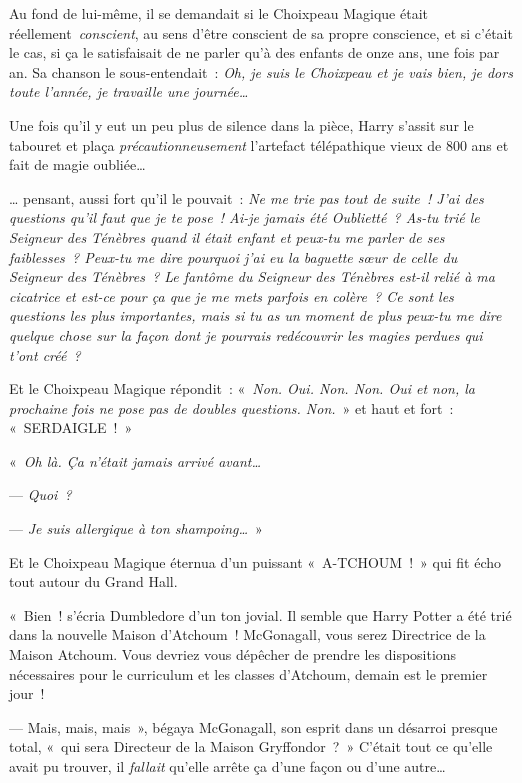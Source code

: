 \later

Au fond de lui-même, il se demandait si le Choixpeau Magique était réellement~\emph{conscient}, au sens d'être conscient de sa propre conscience, et si c'était le cas, si ça le satisfaisait de ne parler qu'à des enfants de onze ans, une fois par an. Sa chanson le sous-entendait~: \emph{Oh, je suis le Choixpeau et je vais bien, je dors toute l'année, je travaille une journée…}

Une fois qu'il y eut un peu plus de silence dans la pièce, Harry s'assit sur le tabouret et plaça \emph{précautionneusement} l'artefact télépathique vieux de 800 ans et fait de magie oubliée…

… pensant, aussi fort qu'il le pouvait~: \emph{Ne me trie pas tout de suite~! J'ai des questions qu'il faut que je te pose~! Ai-je jamais été Oublietté~? As-tu trié le Seigneur des Ténèbres quand il était enfant et peux-tu me parler de ses faiblesses~? Peux-tu me dire pourquoi j'ai eu la baguette sœur de celle du Seigneur des Ténèbres~? Le fantôme du Seigneur des Ténèbres est-il relié à ma cicatrice et est-ce pour ça que je me mets parfois en colère~? Ce sont les questions les plus importantes, mais si tu as un moment de plus peux-tu me dire quelque chose sur la façon dont je pourrais redécouvrir les magies perdues qui t'ont créé~?}

Et le Choixpeau Magique répondit~: «~\emph{Non. Oui. Non. Non. Oui et non, la prochaine fois ne pose pas de doubles questions. Non.}~» et haut et fort~: «~SERDAIGLE~!~»

\later

«~\emph{Oh là. Ça n'était jamais arrivé avant…}

--- \emph{Quoi~?}

--- \emph{Je suis allergique à ton shampoing…}~»

Et le Choixpeau Magique éternua d'un puissant «~A-TCHOUM~!~» qui fit écho tout autour du Grand Hall.

«~Bien~! s'écria Dumbledore d'un ton jovial. Il semble que Harry Potter a été trié dans la nouvelle Maison d'Atchoum~! McGonagall, vous serez Directrice de la Maison Atchoum. Vous devriez vous dépêcher de prendre les dispositions nécessaires pour le curriculum et les classes d'Atchoum, demain est le premier jour~!

--- Mais, mais, mais~», bégaya McGonagall, son esprit dans un désarroi presque total, «~qui sera Directeur de la Maison Gryffondor~?~» C'était tout ce qu'elle avait pu trouver, il \emph{fallait} qu'elle arrête ça d'une façon ou d'une autre…

